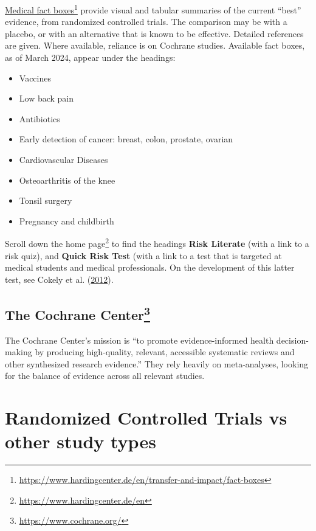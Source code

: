 \documentclass[
  10pt,
  b5paper]{book}
\providecommand{\tightlist}{%
  \setlength{\itemsep}{0pt}\setlength{\parskip}{0pt}}
\begin{document}
\href{https://www.hardingcenter.de/en/transfer-and-impact/fact-boxes}{Medical fact
boxes}\footnote{\url{https://www.hardingcenter.de/en/transfer-and-impact/fact-boxes}}
provide visual and tabular summaries of the current ``best'' evidence,
from randomized controlled trials. The comparison may be with a placebo,
or with an alternative that is known to be effective. Detailed
references are given. Where available, reliance is on Cochrane studies.
Available fact boxes, as of March 2024, appear under the headings:

\begin{itemize}
\tightlist
\item
  Vaccines
\item
  Low back pain
\item
  Antibiotics
\item
  Early detection of cancer: breast, colon, prostate, ovarian
\item
  Cardiovascular Diseases
\item
  Osteoarthritis of the knee
\item
  Tonsil surgery
\item
  Pregnancy and childbirth
\end{itemize}

Scroll down the home page\footnote{\url{https://www.hardingcenter.de/en}} to find the headings \textbf{Risk
Literate} (with a link to a risk quiz), and \textbf{Quick Risk Test} (with a
link to a test that is targeted at medical students and medical
professionals. On the development of this latter test, see
Cokely et al. (\protect\hyperlink{ref-cokely2012measuring}{2012}).

\hypertarget{the-cochrane-center04-medical-4}{%
\subsection*{\texorpdfstring{The Cochrane Center\footnote{\url{https://www.cochrane.org/}}}{The Cochrane Center}}\label{the-cochrane-center04-medical-4}}

The Cochrane Center's mission is ``to promote evidence-informed health
decision-making by producing high-quality, relevant, accessible
systematic reviews and other synthesized research evidence.'' They rely
heavily on meta-analyses, looking for the balance of evidence across all
relevant studies.

\hypertarget{ss:rct}{%
\section{Randomized Controlled Trials vs other study types}\label{ss:rct}}
\end{document}
